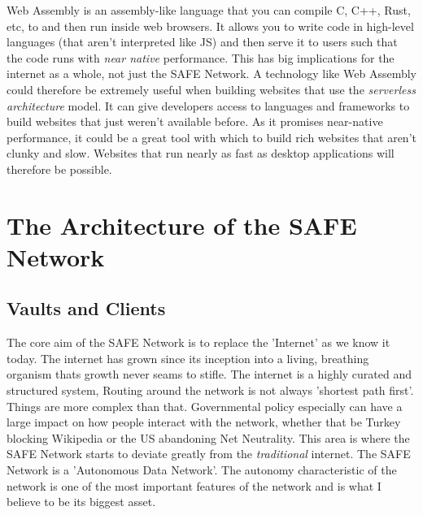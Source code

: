 \documentclass{l4proj}
\begin{document}
Web Assembly is an assembly-like language that you can compile C, C++, Rust, etc, to and then run inside web browsers. It allows you to write code in high-level languages (that aren't interpreted like JS) and then serve it to users such that the code runs with \textit{near native} performance. This has big implications for the internet as a whole, not just the SAFE Network. A technology like Web Assembly could therefore be extremely useful when building websites that use the \textit{serverless architecture} model. It can give developers access to languages and frameworks to build websites that just weren't available before. As it promises near-native performance, it could be a great tool with which to build rich websites that aren't clunky and slow. Websites that run nearly as fast as desktop applications will therefore be possible.

\chapter{The Architecture of the SAFE Network}

\section{Vaults and Clients}

The core aim of the SAFE Network is to replace the 'Internet' as we know it today. The internet has grown since its inception into a living, breathing organism thats growth never seams to stifle. The internet is a highly curated and structured system, Routing around the network is not always 'shortest path first'. Things are more complex than that. Governmental policy especially can have a large impact on how people interact with the network, whether that be Turkey blocking Wikipedia or the US abandoning Net Neutrality. This area is where the SAFE Network starts to deviate greatly from the \textit{traditional} internet. The SAFE Network is a 'Autonomous Data Network'. The autonomy characteristic of the network is one of the most important features of the network and is what I believe to be its biggest asset.
\end{document}
